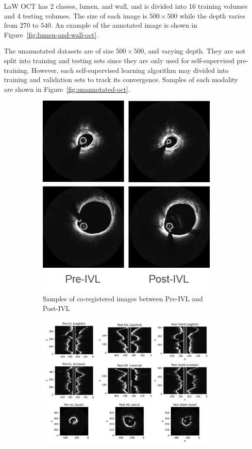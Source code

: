 \documentclass[a4paper,11pt,oneside]{report}
\begin{document}
LaW OCT has 2 classes, lumen, and wall, and is divided into 16 training volumes and 4 testing volumes. The size of each image is $500\times 500$ while the depth varies from $270$ to $540$. An example of the annotated image is shown in Figure~\ref{fig:lumen-and-wall-oct}.

The unannotated datasets are of size $500\times 500$, and varying depth. They are not split into training and testing sets since they are only used for self-supervised pre-training. However, each self-supervised learning algorithm may divided into training and validation sets to track its convergence. Samples of each modality are shown in Figure~\ref{fig:unannotated-oct}.

\begin{figure}[hbt]
    \begin{subfigure}[t]{0.49\textwidth}
        \centering
        \includegraphics[width=0.65\linewidth]{figures/fig_datasets_coregistered_prepostivl.png}
        \caption{Samples of co-registered images between Pre-IVL and Post-IVL}
        \label{fig:co-registered-oct}
    \end{subfigure}%
    \hfill
    \begin{subfigure}[t]{0.49\textwidth}
        \centering
        \includegraphics[width=1\linewidth]{figures/fig_datasets_unlabeled_oct_sample.pdf}

\end{subfigure}
\end{figure}
\end{document}
